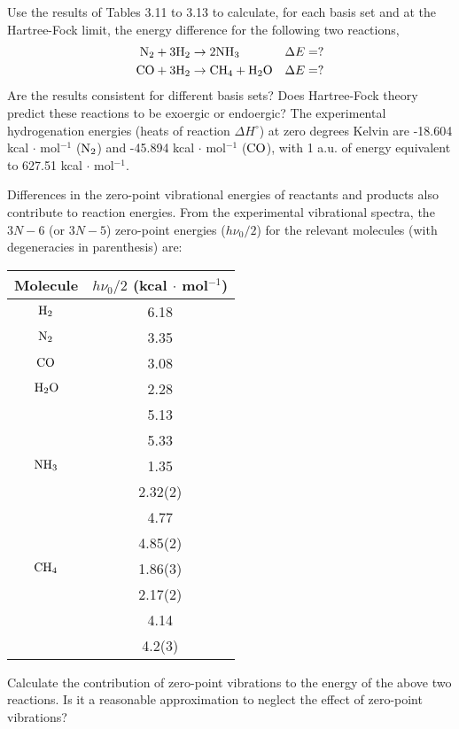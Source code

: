 \documentclass[a4paper]{book}
\begin{document}
	\begin{exercise}
	Use the results of Tables 3.11 to 3.13 to calculate, for each basis set and at the Hartree-Fock limit, the energy difference for the following two reactions,
	\begin{align*}
		\ce{N2} + 3 \ce{H2} &\rightarrow 2 \ce{NH3} & & \Delta E = ? \\
		\ce{CO} + 3 \ce{H2} &\rightarrow \ce{CH4} + \ce{H2O} &  & \Delta E = ?
	\end{align*}
	Are the results consistent for different basis sets? Does Hartree-Fock theory predict these reactions to be exoergic or endoergic? The experimental hydrogenation energies (heats of reaction $\Delta H^\circ$) at zero degrees Kelvin are -18.604 kcal $\cdot$ mol${}^{-1}$ ($\ce{N2}$) and -45.894 kcal $\cdot$ mol${}^{-1}$ ($\ce{CO}$), with 1 a.u. of energy equivalent to 627.51 kcal $\cdot$ mol${}^{-1}$.
	
	Differences in the zero-point vibrational energies of reactants and products also contribute to reaction energies. From the experimental vibrational spectra, the $3N-6$ (or $3N-5$) zero-point energies ($h\nu_0/2$) for the relevant molecules (with degeneracies in parenthesis) are:
	\begin{center}
	\begin{tabular}{cc} \hline
	Molecule & $h\nu_0/2$ (kcal $\cdot$ mol${}^{-1}$) \\ \hline
	$\ce{H2}$ & 6.18 \\
	$\ce{N2}$ & 3.35 \\
	$\ce{CO}$ & 3.08 \\
	$\ce{H2O}$ & 2.28 \\
			& 5.13 \\
			& 5.33 \\
	$\ce{NH3}$ & 1.35 \\
			& 2.32(2) \\
			& 4.77 \\
			& 4.85(2) \\
	$\ce{CH4}$ & 1.86(3) \\
			& 2.17(2) \\
			& 4.14 \\
			& 4.2(3) \\ \hline
	\end{tabular}
	\end{center}
	Calculate the contribution of zero-point vibrations to the energy of the above two reactions. Is it a reasonable approximation to neglect the effect of zero-point vibrations?
	\end{exercise}
	
\end{document}
